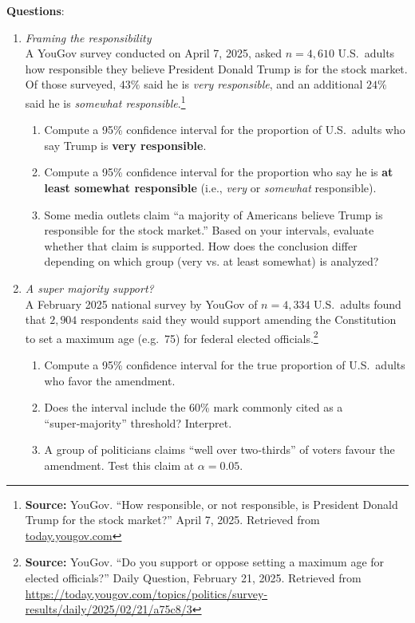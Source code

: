 \documentclass{article}
\begin{document}
\textbf{Questions}:
\begin{enumerate}
\item  \emph{Framing the responsibility} \\
      A YouGov survey conducted on April 7, 2025, asked $n = 4{,}610$ U.S.\ adults how responsible they believe President Donald Trump is for the stock market. Of those surveyed, $43\%$ said he is \emph{very responsible}, and an additional $24\%$ said he is \emph{somewhat responsible}.\footnote{\textbf{Source:} YouGov. “How responsible, or not responsible, is President Donald Trump for the stock market?” April 7, 2025. Retrieved from \href{https://today.yougov.com/topics/politics/survey-results/daily/2025/04/07/6be5c/3}{today.yougov.com}}
      \begin{enumerate}[label=(\alph*)]
         \item Compute a 95\% confidence interval for the proportion of U.S.\ adults who say Trump is \textbf{very responsible}.  
         \item Compute a 95\% confidence interval for the proportion who say he is \textbf{at least somewhat responsible} (i.e., \emph{very} or \emph{somewhat} responsible).  
         \item Some media outlets claim “a majority of Americans believe Trump is responsible for the stock market.” Based on your intervals, evaluate whether that claim is supported. How does the conclusion differ depending on which group (very vs. at least somewhat) is analyzed?
      \end{enumerate}

\item \emph{A super majority support?} \\ A February 2025 national survey by YouGov of $n=4{,}334$ U.S.\ adults found that $2{,}904$ respondents 
      said they would support amending the Constitution to set a maximum age (e.g.\ 75) for federal elected officials.\footnote{\textbf{Source:} YouGov. “Do you support or oppose setting a maximum age for elected officials?” Daily Question, February 21, 2025. Retrieved from \url{https://today.yougov.com/topics/politics/survey-results/daily/2025/02/21/a75c8/3}}
      \begin{enumerate}[label=(\alph*)]
         \item Compute a 95\% confidence interval for the true proportion of U.S.\ adults who favor the amendment.  
         \item Does the interval include the 60\% mark commonly cited as a “super‑majority” threshold?  Interpret.  
         \item A group of politicians claims “well over two‑thirds” of voters favour the amendment.  Test this claim at $\alpha=0.05$.
      \end{enumerate}
      

\end{enumerate}
\end{document}
